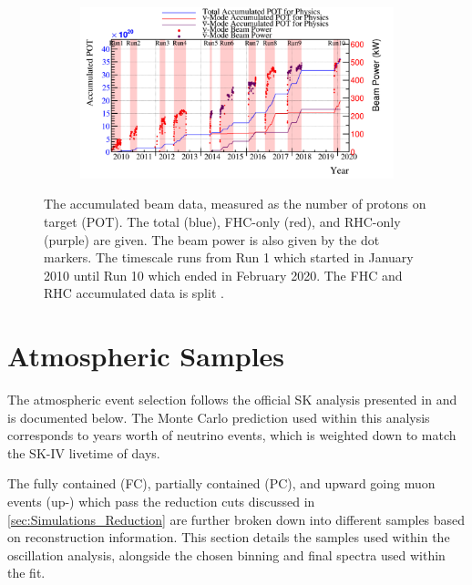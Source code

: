 \begin{figure}[h]
  \begin{subfigure}[t]{\textwidth}
    \includegraphics[width=\textwidth, trim={0mm 0mm 0mm 0mm}, clip,page=1]{Figures/Selections/BeamPowerAndPOT.pdf}
  \end{subfigure}
  \caption{The accumulated beam data, measured as the number of protons on target (POT). The total (blue), FHC-only (red), and RHC-only (purple) are given. The beam power is also given by the dot markers. The timescale runs from Run 1 which started in January 2010 until Run 10 which ended in February 2020. The FHC and RHC accumulated data is split .}
  \label{fig:SelsAndSysts_Beam_PowerAndPOT}
\end{figure}

\newpage
\section{Atmospheric Samples}
\label{sec:SelsAndSysts_Sels_Atms}

The atmospheric event selection follows the official SK analysis presented in \cite{Jiang2019-iw} and is documented below. The Monte Carlo prediction used within this analysis corresponds to  years worth of neutrino events, which is weighted down to match the SK-IV livetime of  days.

The fully contained (FC), partially contained (PC), and upward going muon events (up-\quickmath{\mu}) which pass the reduction cuts discussed in \autoref{sec:Simulations_Reduction} are further broken down into different samples based on reconstruction information. This section details the samples used within the oscillation analysis, alongside the chosen binning and final spectra used within the fit.

